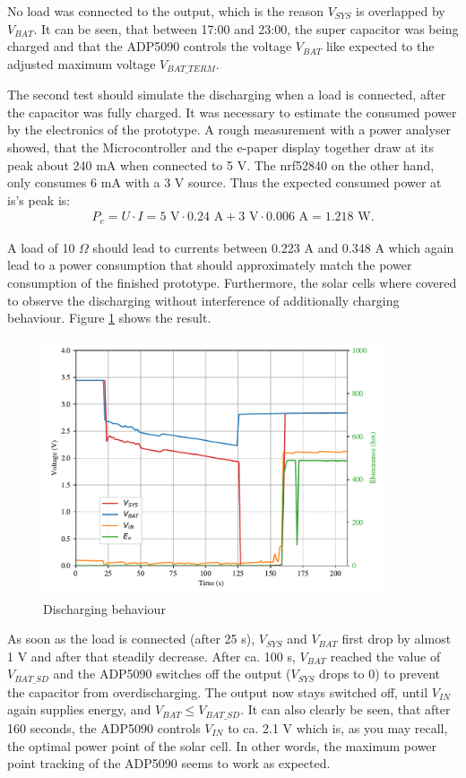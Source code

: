 No load was connected to the output, which is the reason $V_{SYS}$ is overlapped by $V_{BAT}$.
It can be seen, that between 17:00 and 23:00, the super capacitor was being charged and
that the ADP5090 controls the voltage $V_{BAT}$ like expected to the adjusted maximum voltage $V_{BAT\_TERM}$.

The second test should simulate the discharging when a load is connected, after the capacitor was fully charged.
It was necessary to estimate the consumed power by the electronics of the prototype.
A rough measurement with a power analyser showed, that the Microcontroller and the e-paper display together draw at its peak about 240 mA when connected to 5 V. The nrf52840 on the other hand, only consumes 6 mA with a 3 V source. Thus the expected consumed power at is's peak is:
\begin{align}
	P_{e} = U\cdot I = 5\text{ V}\cdot 0.24 \text{ A} + 3\text{ V}\cdot 0.006 \text{ A} = 1.218 \text{ W}.
\end{align}
  

A load of 10 $\Omega$ should lead to currents between 0.223 A and 0.348 A which again lead to a power consumption that should approximately match the power consumption of the finished prototype.
Furthermore, the solar cells where covered to observe the discharging without interference of additionally charging behaviour.
Figure \ref{development:discharge} shows the result.
 
\begin{figure}[h]
	\centering
	\includegraphics[width=0.9\textwidth]{5-development/hardware/graphics/entladen.pdf}
	\caption{Discharging behaviour\label{development:discharge}}
\end{figure}

As soon as the load is connected (after 25 s), $V_{SYS}$ and $V_{BAT}$ first drop by almost 1 V and after that steadily decrease.
After ca. 100 s, $V_{BAT}$ reached the value of $V_{BAT\_SD}$ and the ADP5090 switches off the output ($V_{SYS}$ drops to 0) to prevent the capacitor from overdischarging.
The output now stays switched off, until $V_{IN}$ again supplies energy, and $V_{BAT} \le V_{BAT\_SD}$.
It can also clearly be seen, that after 160 seconds, the ADP5090 controls $V_{IN}$ to ca. 2.1 V which is, as you may recall, the optimal power point of the solar cell.
In other words, the maximum power point tracking of the ADP5090 seems to work as expected.
